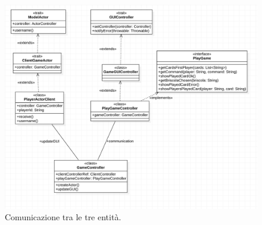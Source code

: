 \begin{itemize}
    \begin{figure}[!tbh]
    \centering
 	 \includegraphics[width=\linewidth]{patternMediatorGameController.png}
 	 \caption{Comunicazione tra le tre entità.}
  	\label{fig:pattern_mediator}
	\end{figure}

     \clearpage


\end{itemize}
